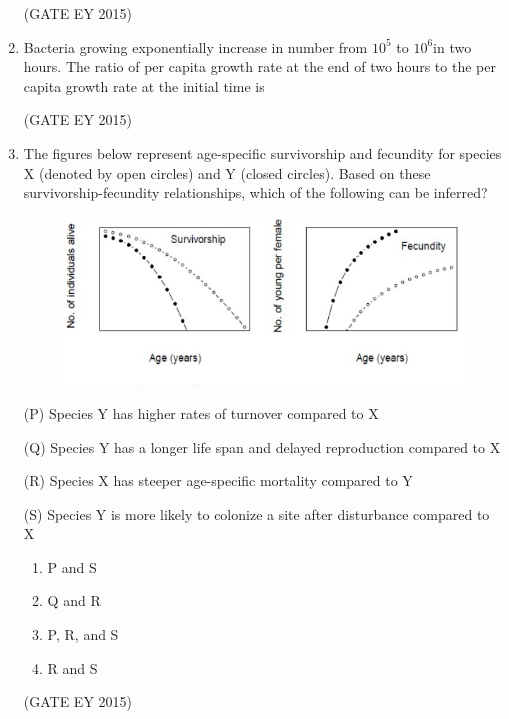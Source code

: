 \documentclass[journal,12pt,onecolumn]{IEEEtran}
\theoremstyle{remark}
\begin{document}
\begin{enumerate}
\hfill{(GATE EY 2015)}


\item 
Bacteria growing exponentially increase in number from 
 $10^{5}$ to $10^{6}$in two hours. The ratio of per capita growth rate at the end of two hours to the per capita growth rate at the initial time is \underline{\hspace{2cm}}


\hfill{(GATE EY 2015)}




\item The figures below represent age-specific survivorship and fecundity for species X (denoted by open circles) and Y (closed circles). Based on these survivorship-fecundity relationships, which of the following can be inferred?
\begin{figure}[H]
    \centering
    \includegraphics[]{figs/Q.54.png}
    \caption{}
    \label{fig:12}
\end{figure}

(P) Species Y has higher rates of turnover compared to X

(Q) Species Y has a longer life span and delayed reproduction compared to X

(R) Species X has steeper age-specific mortality compared to Y

(S) Species Y is more likely to colonize a site after disturbance compared to X


\begin{multicols}{4}
\begin{enumerate}
    
\item P and S
\item Q and R
\item P, R, and S
\item R and S

    \end{enumerate}
    \end{multicols}
\hfill{(GATE EY 2015)}


\end{enumerate}
\end{document}
